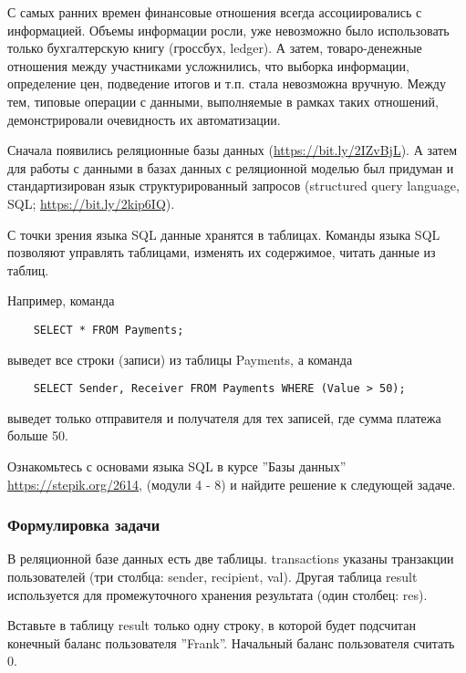 
С самых ранних времен финансовые отношения всегда ассоциировались с информацией. Объемы информации росли, уже невозможно было использовать только бухгалтерскую книгу (гроссбух, ledger). А затем, товаро-денежные отношения между участниками усложнились, что выборка информации, определение цен, подведение итогов и т.п. стала невозможна вручную. Между тем, типовые операции с данными, выполняемые в рамках таких отношений, демонстрировали очевидность их автоматизации.

Сначала появились реляционные базы данных (\url{https://bit.ly/2IZvBjL}). А затем для работы с 
данными в базах данных с реляционной моделью был придуман и стандартизирован язык структурированный запросов 
(structured query language, SQL; \url{https://bit.ly/2kip6IQ}).

С точки зрения языка SQL данные хранятся в таблицах. Команды языка SQL позволяют управлять таблицами, изменять их содержимое, читать данные из таблиц.

Например, команда

\begin{verbatim}
    SELECT * FROM Payments;
\end{verbatim}

выведет все строки (записи) из таблицы Payments, а команда

\begin{verbatim}
    SELECT Sender, Receiver FROM Payments WHERE (Value > 50);
\end{verbatim}

выведет только отправителя и получателя для тех записей, где сумма платежа больше 50.

Ознакомьтесь с основами языка SQL в курсе ''Базы данных'' \url{https://stepik.org/2614}, (модули 4 - 8) и найдите решение к следующей задаче.

\subsubsection*{Формулировка задачи}

В реляционной базе данных есть две таблицы. transactions указаны транзакции пользователей (три столбца: sender, recipient, val). Другая таблица result используется для промежуточного хранения результата (один столбец: res).

Вставьте в таблицу result только одну строку, в которой будет подсчитан конечный баланс пользователя ''Frank''. Начальный баланс пользователя считать 0.

